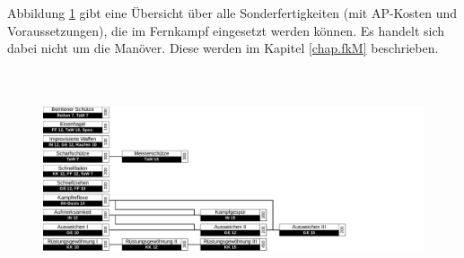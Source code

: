 Abbildung \ref{fig.fSF} gibt eine Übersicht über alle Sonderfertigkeiten (mit AP-Kosten und Voraussetzungen), die im Fernkampf eingesetzt werden können.
Es handelt sich dabei nicht um die Manöver. Diese werden im Kapitel \ref{chap.fkM} beschrieben.

\begin{figure}
    \label{fig.fSF}
    \centering
    \includegraphics[width=16.93cm,height=6.454cm]{fig/fkSF.pdf}
\end{figure}




















































